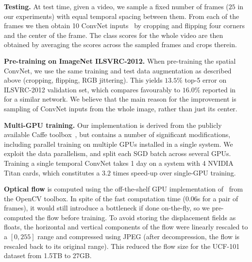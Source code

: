\documentclass{article} %
\begin{document}
\noindent\textbf{Testing.} At test time, given a video, we sample a fixed number of frames ($25$ in our experiments) with equal temporal spacing between them. 
From each of the frames we then obtain 10 ConvNet inputs~\cite{Krizhevsky12} by cropping and flipping four corners and the center of the frame.
The class scores for the whole video are then obtained by averaging the scores across the sampled frames and crops therein.

\noindent\textbf{Pre-training on ImageNet ILSVRC-2012.}
When pre-training the spatial ConvNet, we use the same training and test data augmentation as described above (cropping, flipping, RGB jittering). 
This yields $13.5\%$ top-5 error on ILSVRC-2012 validation set, which compares favourably to $16.0\%$ reported in~\cite{Zeiler13} for a similar network. 
We believe that the main reason for the improvement is sampling of ConvNet inputs from the whole image, rather than just its center.

\noindent\textbf{Multi-GPU training.}
Our implementation is derived from the publicly available Caffe toolbox~\cite{Jia13}, but contains a number of significant modifications, including parallel 
training on multiple GPUs installed in a single system. We exploit the data parallelism, and split each SGD batch across several GPUs.
Training a single temporal ConvNet takes 1 day on a system with 4 NVIDIA Titan cards, which constitutes a $3.2$ times speed-up over single-GPU training.

\noindent\textbf{Optical flow} is computed using the off-the-shelf GPU implementation of~\cite{Brox04} from the OpenCV toolbox.
In spite of the fast computation time ($0.06$s for a pair of frames), it would still introduce a bottleneck if done on-the-fly, 
so we pre-computed the flow before training. To avoid storing the displacement fields as floats, the horizontal and vertical components of the flow were 
linearly rescaled to a $[0,255]$ range and compressed using JPEG (after decompression, the flow is rescaled back to its original range).
This reduced the flow size for the UCF-101 dataset from 1.5TB to 27GB.
\end{document}
